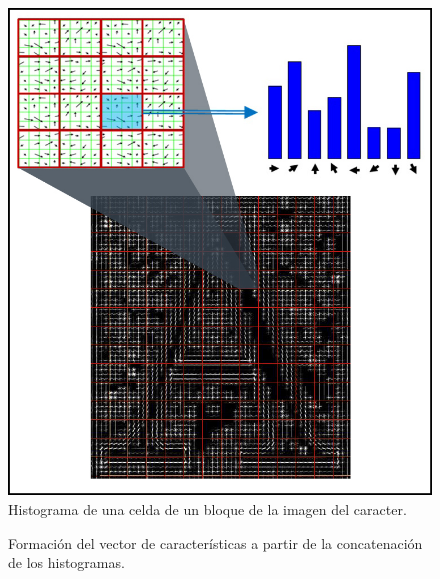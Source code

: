 		\begin{figure}[htbp]
			\centering
			\centerline{ \includegraphics[scale=0.5]{img/letter_A_histogram.jpg} }
			\caption[Histograma de una celda]{Histograma de una celda de un bloque de la imagen del caracter.}
			\label{fig: Histograma de Celda}
		\end{figure}
		
		\begin{figure}[htbp]
			\centering
			\caption[Vector HOG]{Formación del vector de características a partir de la concatenación de los histogramas.}
			\label{fig: Vector HOG}
		\end{figure}
